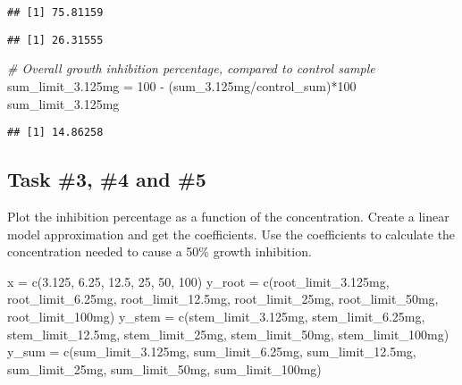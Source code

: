\documentclass[
]{article}
\newenvironment{Shaded}{\begin{snugshade}}{\end{snugshade}}
\newcommand{\CommentTok}[1]{\textcolor[rgb]{0.56,0.35,0.01}{\textit{#1}}}
\newcommand{\DecValTok}[1]{\textcolor[rgb]{0.00,0.00,0.81}{#1}}
\newcommand{\FloatTok}[1]{\textcolor[rgb]{0.00,0.00,0.81}{#1}}
\newcommand{\FunctionTok}[1]{\textcolor[rgb]{0.00,0.00,0.00}{#1}}
\newcommand{\NormalTok}[1]{#1}
\newcommand{\OtherTok}[1]{\textcolor[rgb]{0.56,0.35,0.01}{#1}}
\newcommand{\SpecialCharTok}[1]{\textcolor[rgb]{0.00,0.00,0.00}{#1}}
\begin{document}
\begin{verbatim}
## [1] 75.81159
\end{verbatim}

\begin{Shaded}
\end{Shaded}

\begin{verbatim}
## [1] 26.31555
\end{verbatim}

\begin{Shaded}
\begin{Highlighting}[]
\CommentTok{\# Overall growth inhibition percentage, compared to control sample}
\NormalTok{sum\_limit\_3}\FloatTok{.125}\NormalTok{mg }\OtherTok{=} \DecValTok{100} \SpecialCharTok{{-}}\NormalTok{ (sum\_3}\FloatTok{.125}\NormalTok{mg}\SpecialCharTok{/}\NormalTok{control\_sum)}\SpecialCharTok{*}\DecValTok{100}
\NormalTok{sum\_limit\_3}\FloatTok{.125}\NormalTok{mg}
\end{Highlighting}
\end{Shaded}

\begin{verbatim}
## [1] 14.86258
\end{verbatim}

\hypertarget{task-3-4-and-5}{%
\subsection{Task \#3, \#4 and \#5}\label{task-3-4-and-5}}

Plot the inhibition percentage as a function of the concentration.
Create a linear model approximation and get the coefficients. Use the
coefficients to calculate the concentration needed to cause a 50\%
growth inhibition.

\begin{Shaded}
\begin{Highlighting}[]
\NormalTok{x }\OtherTok{=} \FunctionTok{c}\NormalTok{(}\FloatTok{3.125}\NormalTok{, }\FloatTok{6.25}\NormalTok{, }\FloatTok{12.5}\NormalTok{, }\DecValTok{25}\NormalTok{, }\DecValTok{50}\NormalTok{, }\DecValTok{100}\NormalTok{)}
\NormalTok{y\_root }\OtherTok{=} \FunctionTok{c}\NormalTok{(root\_limit\_3}\FloatTok{.125}\NormalTok{mg, root\_limit\_6}\FloatTok{.25}\NormalTok{mg, root\_limit\_12}\FloatTok{.5}\NormalTok{mg, root\_limit\_25mg, root\_limit\_50mg, root\_limit\_100mg)}
\NormalTok{y\_stem }\OtherTok{=} \FunctionTok{c}\NormalTok{(stem\_limit\_3}\FloatTok{.125}\NormalTok{mg, stem\_limit\_6}\FloatTok{.25}\NormalTok{mg, stem\_limit\_12}\FloatTok{.5}\NormalTok{mg, stem\_limit\_25mg, stem\_limit\_50mg, stem\_limit\_100mg)}
\NormalTok{y\_sum }\OtherTok{=} \FunctionTok{c}\NormalTok{(sum\_limit\_3}\FloatTok{.125}\NormalTok{mg, sum\_limit\_6}\FloatTok{.25}\NormalTok{mg, sum\_limit\_12}\FloatTok{.5}\NormalTok{mg, sum\_limit\_25mg, sum\_limit\_50mg, sum\_limit\_100mg)}
\end{Highlighting}
\end{Shaded}
\end{document}
